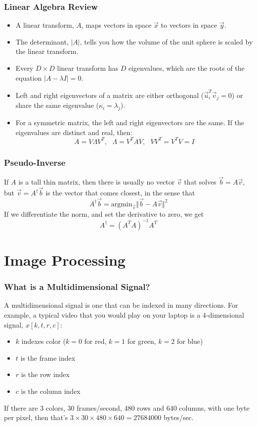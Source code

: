 \documentclass{beamer}
\begin{document}
\begin{frame}
  \frametitle{Linear Algebra Review}
  \begin{itemize}
  \item A linear transform, $A$, maps vectors in space $\vec{x}$ to vectors in space $\vec{y}$.
  \item The determinant, $|A|$, tells you how the volume of the unit
    sphere is scaled by the linear transform.
  \item Every $D\times D$ linear transform has $D$ eigenvalues, which
    are the roots of the equation $|A-\lambda I|=0$.
  \item Left and right eigenvectors of a matrix are either orthogonal
    ($\vec{u}_i^T\vec{v}_j=0$) or share the same eigenvalue ($\kappa_i=\lambda_j$).
  \item For a symmetric matrix, the left and right eigenvectors are
    the same.  If the eigenvalues are distinct and real, then:
    \[
    A=V\Lambda V^T,~~~\Lambda = V^TAV,~~~VV^T=V^TV=I
    \]
  \end{itemize}
\end{frame}

\begin{frame}
  \frametitle{Pseudo-Inverse}

   If $A$ is a tall thin matrix, then there is usually no vector
   $\vec{v}$ that solves $\vec{b}=A\vec{v}$, but $\vec{v}=A^\dag
   \vec{b}$ is the vector that comes closest, in the sense that
   \[
   A^\dag\vec{b} = \mbox{argmin}_{\vec{v}}\Vert\vec{b}-A\vec{v}\Vert^2
   \]
   If we differentiate the norm, and set the derivative to zero, we get
   \[
   A^\dag = (A^TA)^{-1}A^T
   \]
\end{frame}


\section[Images]{Image Processing}
\setcounter{subsection}{1}

\begin{frame}
  \frametitle{What is a Multidimensional Signal?}

  A multidimensional signal is one that can be indexed in many
  directions.  For example, a typical video that you would play on
  your laptop is a 4-dimensional signal, $x[k,t,r,c]$:
  \begin{itemize}
  \item $k$ indexes color ($k=0$ for red, $k=1$ for green, $k=2$ for blue)
  \item $t$ is the frame index
  \item $r$ is the row index
  \item $c$ is the column index
  \end{itemize}
  If there are 3 colors, 30 frames/second, 480 rows and 640 columns,
  with one byte per pixel, then that's $3\times 30\times 480\times
  640=27684000$ bytes/sec.
\end{frame}
  
\end{document}
